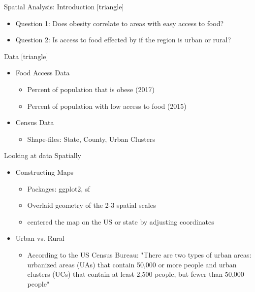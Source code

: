 \documentclass{beamer} %
\begin{document}

\begin{frame}{Spatial Analysis: Introduction}
[triangle]
  \begin{itemize}
  \item Question 1: Does obesity correlate to areas with easy access to food?
  \item Question 2: Is access to food effected by if the region is urban or rural?
  \end{itemize}
\end{frame}

\begin{frame}{Data}
[triangle]
\begin{itemize}
  \item Food Access Data
    \begin{itemize}
        \item Percent of population that is obese (2017)
        \item Percent of population with low access to food (2015)
    \end{itemize}
    \item Census Data
        \begin{itemize}
            \item Shape-files: State, County, Urban Clusters
        \end{itemize}
\end{itemize}
\end{frame}


\begin{frame}{Looking at data Spatially}
\begin{itemize}
    \item Constructing Maps
        \begin{itemize}
            \item Packages: ggplot2, sf
            \item Overlaid geometry of the 2-3 spatial scales
            \item centered the map on the US or state by adjusting coordinates
        \end{itemize}
    \item Urban vs. Rural
        \begin{itemize}
            \item According to the US Census Bureau: "There are two types of urban areas: urbanized areas (UAs) that contain 50,000 or more people and urban clusters (UCs) that contain at least 2,500 people, but fewer than 50,000 people"
        \end{itemize}
\end{itemize}
\end{frame}
\end{document}
